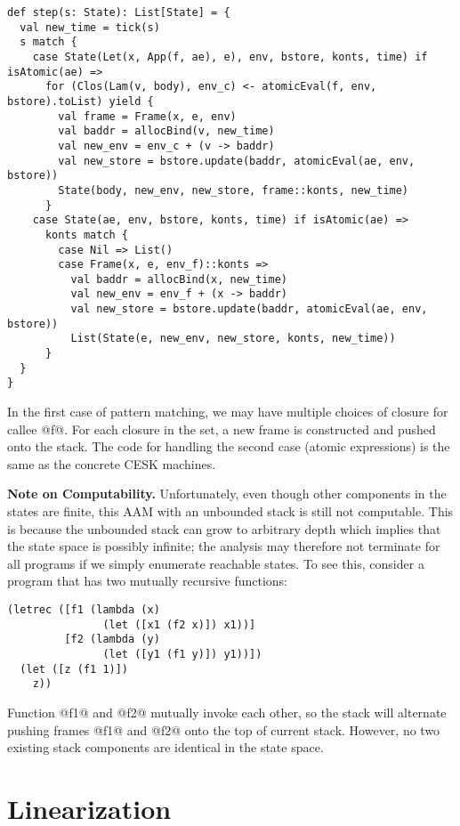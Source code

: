 \documentclass[acmsmall,review,anonymous]{acmart}\settopmatter{printfolios=true,printccs=false,printacmref=false}
\begin{document}
\begin{lstlisting}
def step(s: State): List[State] = {
  val new_time = tick(s)
  s match {
    case State(Let(x, App(f, ae), e), env, bstore, konts, time) if isAtomic(ae) =>
      for (Clos(Lam(v, body), env_c) <- atomicEval(f, env, bstore).toList) yield {
        val frame = Frame(x, e, env)
        val baddr = allocBind(v, new_time)
        val new_env = env_c + (v -> baddr)
        val new_store = bstore.update(baddr, atomicEval(ae, env, bstore))
        State(body, new_env, new_store, frame::konts, new_time)
      }
    case State(ae, env, bstore, konts, time) if isAtomic(ae) =>
      konts match {
        case Nil => List()
        case Frame(x, e, env_f)::konts =>
          val baddr = allocBind(x, new_time)
          val new_env = env_f + (x -> baddr)
          val new_store = bstore.update(baddr, atomicEval(ae, env, bstore))
          List(State(e, new_env, new_store, konts, new_time))
      }
  }
}
\end{lstlisting}

In the first case of pattern matching, we may have multiple choices of closure for callee @f@.
For each closure in the set, a new frame is constructed and pushed onto the stack.
The code for handling the second case (atomic expressions) is the same as the concrete CESK
machines.

\textbf{Note on Computability.}
Unfortunately, even though other components in the states are finite,
this AAM with an unbounded stack is still not computable.
This is because the unbounded stack can grow to arbitrary depth which implies that the state
space is possibly infinite; the analysis may therefore not terminate for all programs if we
simply enumerate reachable states. To see this, consider a program that has two mutually
recursive functions:

\begin{lstlisting}
(letrec ([f1 (lambda (x)
               (let ([x1 (f2 x)]) x1))]
         [f2 (lambda (y)
               (let ([y1 (f1 y)]) y1))])
  (let ([z (f1 1)])
    z))
\end{lstlisting}

Function @f1@ and @f2@ mutually invoke each other, so the stack will
alternate pushing frames @f1@ and @f2@ onto the top of current stack.
However, no two existing stack components are identical in the state space.

\section{Linearization} \label{linear}
\end{document}
